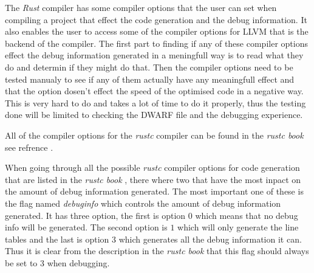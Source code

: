 

The \emph{Rust} compiler has some compiler options that the user can set when compiling a project that effect the code generation and the debug information.
It also enables the user to access some of the compiler options for \gls{LLVM} that is the backend of the compiler.
The first part to finding if any of these compiler options effect the debug information generated in a meningfull way is to read what they do and determin if they might do that.
Then the compiler options need to be tested manualy to see if any of them actually have any meaningfull effect and that the option dosen't effect the speed of the optimised code in a negative way.
This is very hard to do and takes a lot of time to do it properly, thus the testing done will be limited to checking the \gls{DWARF} file and the debugging experience.


All of the compiler options for the \emph{rustc} compiler can be found in the \emph{rustc book} see refrence \cite{rustc-book-codegen}.


When going through all the possible \emph{rustc} compiler options for code generation that are listed in the \emph{rustc book} \cite{rustc-book-codegen}, there where two that have the most inpact on the amount of debug information generated.
The most important one of these is the flag named \emph{debuginfo} which controls the amount of debug information generated.
It has three option, the first is option $0$ which means that no debug info will be generated.
The second option is $1$ which will only generate the line tables and the last is option $3$ which generates all the debug information it can.
Thus it is clear from the description in the \emph{rustc book} that this flag should always be set to $3$ when debugging.


